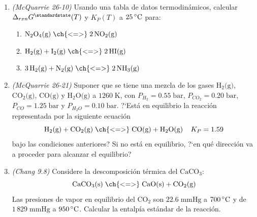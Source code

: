 \documentclass[a4paper,12pt]{article}
\begin{document}
\begin{enumerate}
 \item \textit{(McQuarrie 26-10)} Usando una tabla de datos termodin\'amicos, calcular $\Delta_{rxn}G^\standardstate(T)$ y $K_P(T)$ a $25\,\celsius$ para:
 \begin{enumerate}
  \item $\mbox{N}_2\mbox{O}_4\mbox{(g)}\;\ch{ <=> }\;2\,\mbox{NO}_2\mbox{(g)}$
  \item $\mbox{H}_2\mbox{(g)}+\mbox{I}_2\mbox{(g)}\;\ch{ <=> }\;2\,\mbox{HI(g)}$
  \item $3\,\mbox{H}_2\mbox{(g)}+\mbox{N}_2\mbox{(g)}\;\ch{ <=> }\;2\,\mbox{NH}_3\mbox{(g)}$
 \end{enumerate} %

 \item \textit{(McQuarrie 26-21)} Suponer que se tiene una mezcla de los gases $\mbox{H}_2\mbox{(g)}$, $\mbox{CO}_2\mbox{(g)}$, $\mbox{CO(g)}$ y $\mbox{H}_2\mbox{O(g)}$ a $1260\;\mbox{K}$, con $P_{H_2}=0.55\;\mbox{bar}$, $P_{CO_2}=0.20\;\mbox{bar}$, $P_{CO}=1.25\;\mbox{bar}$ y $P_{H_2O}=0.10\;\mbox{bar}$. ?`Est\'a en equilibrio la reacci\'on representada por la siguiente ecuaci\'on
$$\mbox{H}_2\mbox{(g)}+\mbox{CO}_2\mbox{(g)}\;\ch{ <=> }\;\mbox{CO(g)}+\mbox{H}_2\mbox{O(g)}\;\;\;\;K_P=1.59$$
bajo las condiciones anteriores? Si no est\'a en equilibrio, ?`en qu\'e direcci\'on va a proceder para alcanzar el equilibrio? %

 \item \textit{(Chang 9.8)} Considere la descomposici\'on t\'ermica del $\mbox{CaCO}_3$:
$$\mbox{CaCO}_3\mbox{(s)}\;\ch{ <=> }\;\mbox{CaO(s)}+\mbox{CO}_2\mbox{(g)}$$
Las presiones de vapor en equilibrio del $\mbox{CO}_2$ son $22.6\;\mbox{mmHg}$ a $700\,\celsius$ y de $1\,829\;\mbox{mmHg}$ a $950\,\celsius$. Calcular la entalp\'ia est\'andar de la reacci\'on. %


\end{enumerate}
 
\end{document}
